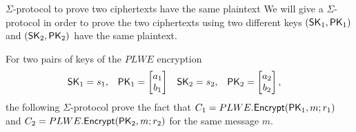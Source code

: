 \begin{section}{$\Sigma$-protocol to prove two ciphertexts have the same plaintext}
  We will give a $\Sigma$-protocol in order to prove the two ciphertexts using two
  different keys $(\mathsf{SK}_1, \mathsf{PK}_1)$ and $(\mathsf{SK}_2, \mathsf{PK}_2)$ have the same plaintext.

  For two pairs of keys of the $PLWE$ encryption
  \begin{align*}
    \mathsf{SK}_1 &= s_1, & \mathsf{PK}_1 &= \begin{bmatrix} a_1 \\ b_1\end{bmatrix} & \mathsf{SK}_2 &= s_2,  & \mathsf{PK}_2 &= \begin{bmatrix} a_2 \\ b_2\end{bmatrix},
  \end{align*}
  the following $\Sigma$-protocol prove the fact that $ C_1 = PLWE.{\mathsf{Encrypt}}(\mathsf{PK}_1, m; r_1)$ and $C_2 = PLWE.{\mathsf{Encrypt}}(\mathsf{PK}_2, m; r_2)$
  for the same message $m$.


\end{section}
